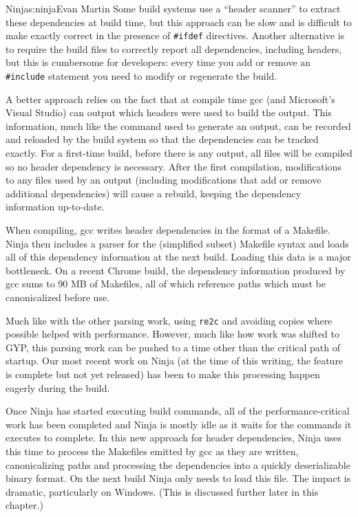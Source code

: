 \begin{aosachapter}{Ninja}{s:ninja}{Evan Martin}
Some build systems use a ``header scanner'' to extract these
dependencies at build time, but this approach can be slow and is
difficult to make exactly correct in the presence of \texttt{\#ifdef}
directives. Another alternative is to require the build files to
correctly report all dependencies, including headers, but this is
cumbersome for developers: every time you add or remove an
\texttt{\#include} statement you need to modify or regenerate the build.

A better approach relies on the fact that at compile time gcc (and
Microsoft's Visual Studio) can output which headers were used to build
the output. This information, much like the command used to generate an
output, can be recorded and reloaded by the build system so that the
dependencies can be tracked exactly. For a first-time build, before
there is any output, all files will be compiled so no header dependency
is necessary. After the first compilation, modifications to any files
used by an output (including modifications that add or remove additional
dependencies) will cause a rebuild, keeping the dependency information
up-to-date.

When compiling, gcc writes header dependencies in the format of a
Makefile. Ninja then includes a parser for the (simplified subset)
Makefile syntax and loads all of this dependency information at the next
build. Loading this data is a major bottleneck. On a recent Chrome
build, the dependency information produced by gcc sums to 90 MB of
Makefiles, all of which reference paths which must be canonicalized
before use.

Much like with the other parsing work, using \texttt{re2c} and avoiding
copies where possible helped with performance. However, much like how
work was shifted to GYP, this parsing work can be pushed to a time other
than the critical path of startup. Our most recent work on Ninja (at the
time of this writing, the feature is complete but not yet released) has
been to make this processing happen eagerly during the build.

Once Ninja has started executing build commands, all of the
performance-critical work has been completed and Ninja is mostly idle as
it waits for the commands it executes to complete. In this new approach
for header dependencies, Ninja uses this time to process the Makefiles
emitted by gcc as they are written, canonicalizing paths and processing
the dependencies into a quickly deserializable binary format. On the
next build Ninja only needs to load this file. The impact is dramatic,
particularly on Windows. (This is discussed further later in this
chapter.)


\end{aosachapter}
